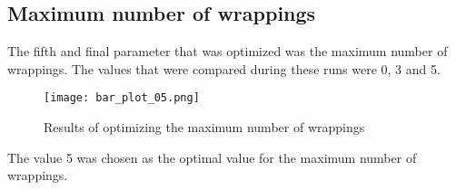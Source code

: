 \subsection{Maximum number of wrappings}
The fifth and final parameter that was optimized was the maximum number of wrappings. The values that were compared during these runs were 0, 3 and 5.

\begin{figure}[H]
	\centering
	\texttt{[image: bar\_plot\_05.png]}
	\caption{Results of optimizing the maximum number of wrappings}
\end{figure}

The value 5 was chosen as the optimal value for the maximum number of wrappings.